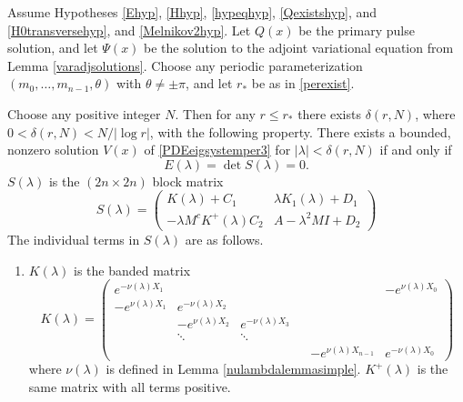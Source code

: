 \documentclass[thesis.tex]{subfiles}
\begin{document}
\begin{theorem}\label{blockmatrixtheorem}
Assume Hypotheses \ref{Ehyp}, \ref{Hhyp}, \ref{hypeqhyp}, \ref{Qexistshyp}, and \ref{H0transversehyp}, and \ref{Melnikov2hyp}. Let $Q(x)$ be the primary pulse solution, and let $\Psi(x)$ be the solution to the adjoint variational equation from Lemma \ref{varadjsolutions}. Choose any periodic parameterization $(m_0, \dots, m_{n-1}, \theta)$ with $\theta \neq \pm \pi$, and let $r_*$ be as in \cref{perexist}. 

Choose any positive integer $N$. Then for any $r \leq r_*$ there exists $\delta(r,N)$, where $0 < \delta(r,N) < N/|\log r|$, with the following property. There exists a bounded, nonzero solution $V(x)$ of \cref{PDEeigsystemper3} for $|\lambda| < \delta(r,N)$ if and only if
\begin{equation}\label{blockmatrixcond}
E(\lambda) = \det S(\lambda) = 0.
\end{equation}
$S(\lambda)$ is the $(2n \times 2n)$ block matrix
\begin{equation}\label{blockeq}
S(\lambda) = 
\begin{pmatrix}
K(\lambda) + C_1 & \lambda K_1(\lambda) + D_1 \\
-\lambda M^c K^+(\lambda) C_2 & A - \lambda^2 MI + D_2
\end{pmatrix}
\end{equation}
The individual terms in $S(\lambda)$ are as follows.

\begin{enumerate}
\item $K(\lambda)$ is the banded matrix
\begin{equation}
K(\lambda) = 
\begin{pmatrix}
e^{-\nu(\lambda)X_1} & & & & & -e^{\nu(\lambda)X_0} \\
-e^{\nu(\lambda)X_1} & e^{-\nu(\lambda)X_2} \\
& -e^{\nu(\lambda)X_2} & e^{-\nu(\lambda)X_3} \\
& \ddots & \ddots & &&  \\
& & & & -e^{\nu(\lambda)X_{n-1}} & e^{-\nu(\lambda)X_0} 
\end{pmatrix}
\end{equation}
where $\nu(\lambda)$ is defined in Lemma \ref{nulambdalemmasimple}. $K^+(\lambda)$ is the same matrix with all terms positive.


\end{enumerate}
\end{theorem}
\end{document}
